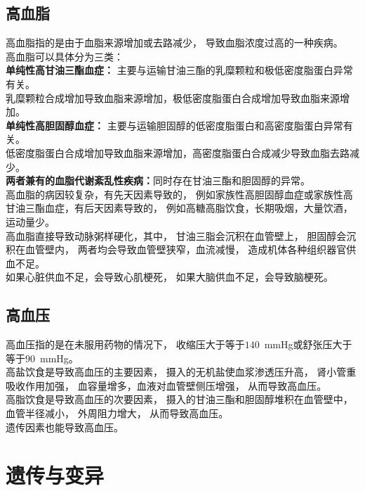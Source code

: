 \documentclass[UTF8]{ctexart}
\begin{document}
\subsection{高血脂}
    高血脂指的是由于血脂来源增加或去路减少，
    导致血脂浓度过高的一种疾病。\\[6mm]
    高血脂可以具体分为三类：\\[3mm]
    \textbf{单纯性高甘油三酯血症：}
    主要与运输甘油三酯的乳糜颗粒和极低密度脂蛋白异常有关。\\[2mm]
    乳糜颗粒合成增加导致血脂来源增加，极低密度脂蛋白合成增加导致血脂来源增加。\\[3mm]
    \textbf{单纯性高胆固醇血症：}
    主要与运输胆固醇的低密度脂蛋白和高密度脂蛋白异常有关。\\[2mm]
    低密度脂蛋白合成增加导致血脂来源增加，高密度脂蛋白合成减少导致血脂去路减少。\\[3mm]
    \textbf{两者兼有的血脂代谢紊乱性疾病：}同时存在甘油三酯和胆固醇的异常。\\[6mm]
    高血脂的病因较复杂，有先天因素导致的，
    例如家族性高胆固醇血症或家族性高甘油三酯血症，有后天因素导致的，
    例如高糖高脂饮食，长期吸烟，大量饮酒，运动量少。\\[3mm]
    高血脂直接导致动脉粥样硬化，其中，
    甘油三脂会沉积在血管壁上，
    胆固醇会沉积在血管壁内，
    两者均会导致血管壁狭窄，血流减慢，
    造成机体各种组织器官供血不足。\\[3mm]
    如果心脏供血不足，会导致心肌梗死，
    如果大脑供血不足，会导致脑梗死。\\

\subsection{高血压}
    高血压指的是在未服用药物的情况下，
    收缩压大于等于$140$~mmHg或舒张压大于等于$90$~mmHg。\\[3mm]
    高盐饮食是导致高血压的主要因素，
    摄入的无机盐使血浆渗透压升高，
    肾小管重吸收作用加强，
    血容量增多，血液对血管壁侧压增强，
    从而导致高血压。\\[3mm]
    高脂饮食是导致高血压的次要因素，
    摄入的甘油三酯和胆固醇堆积在血管壁中，
    血管半径减小，
    外周阻力增大，
    从而导致高血压。\\[3mm]
    遗传因素也能导致高血压。

\newpage

\section{遗传与变异}
\end{document}
